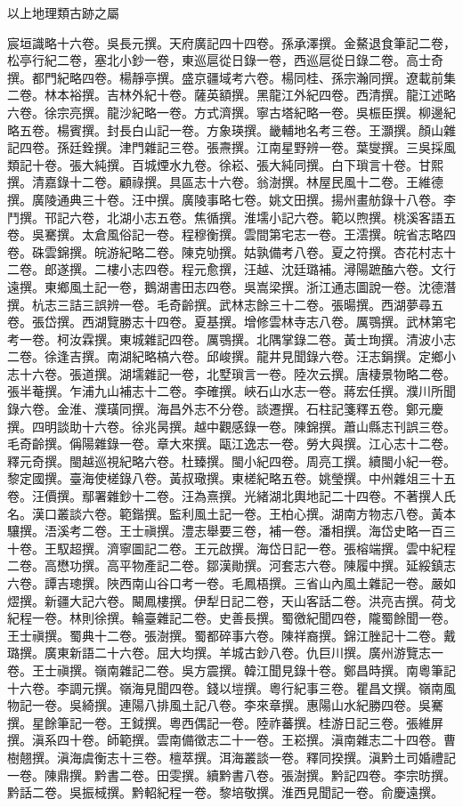 \begin{pinyinscope}
以上地理類古跡之屬

宸垣識略十六卷。吳長元撰。天府廣記四十四卷。孫承澤撰。金鰲退食筆記二卷，松亭行紀二卷，塞北小鈔一卷，東巡扈從日錄一卷，西巡扈從日錄二卷。高士奇撰。都門紀略四卷。楊靜亭撰。盛京疆域考六卷。楊同桂、孫宗瀚同撰。遼載前集二卷。林本裕撰。吉林外紀十卷。薩英額撰。黑龍江外紀四卷。西清撰。龍江述略六卷。徐宗亮撰。龍沙紀略一卷。方式濟撰。寧古塔紀略一卷。吳桭臣撰。柳邊紀略五卷。楊賓撰。封長白山記一卷。方象瑛撰。畿輔地名考三卷。王灝撰。顏山雜記四卷。孫廷銓撰。津門雜記三卷。張燾撰。江南星野辨一卷。葉燮撰。三吳採風類記十卷。張大純撰。百城煙水九卷。徐崧、張大純同撰。白下瑣言十卷。甘熙撰。清嘉錄十二卷。顧祿撰。具區志十六卷。翁澍撰。林屋民風十二卷。王維德撰。廣陵通典三十卷。汪中撰。廣陵事略七卷。姚文田撰。揚州畫舫錄十八卷。李鬥撰。邗記六卷，北湖小志五卷。焦循撰。淮壖小記六卷。範以煦撰。桃溪客語五卷。吳騫撰。太倉風俗記一卷。程穆衡撰。雲間第宅志一卷。王澐撰。皖省志略四卷。硃雲錦撰。皖游紀略二卷。陳克劬撰。姑孰備考八卷。夏之符撰。杏花村志十二卷。郎遂撰。二樓小志四卷。程元愈撰，汪越、沈廷璐補。潯陽蹠醢六卷。文行遠撰。東鄉風土記一卷，鵝湖書田志四卷。吳嵩梁撰。浙江通志圖說一卷。沈德潛撰。杭志三詰三誤辨一卷。毛奇齡撰。武林志餘三十二卷。張暘撰。西湖夢尋五卷。張岱撰。西湖覽勝志十四卷。夏基撰。增修雲林寺志八卷。厲鶚撰。武林第宅考一卷。柯汝霖撰。東城雜記四卷。厲鶚撰。北隅掌錄二卷。黃士珣撰。清波小志二卷。徐逢吉撰。南湖紀略槁六卷。邱峻撰。龍井見聞錄六卷。汪志鋗撰。定鄉小志十六卷。張道撰。湖壖雜記一卷，北墅瑣言一卷。陸次云撰。唐棲景物略二卷。張半菴撰。乍浦九山補志十二卷。李確撰。峽石山水志一卷。蔣宏任撰。濮川所聞錄六卷。金淮、濮璜同撰。海昌外志不分卷。談遷撰。石柱記箋釋五卷。鄭元慶撰。四明談助十六卷。徐兆昺撰。越中觀感錄一卷。陳錦撰。蕭山縣志刊誤三卷。毛奇齡撰。偁陽雜錄一卷。章大來撰。甌江逸志一卷。勞大與撰。江心志十二卷。釋元奇撰。閩越巡視紀略六卷。杜臻撰。閩小紀四卷。周亮工撰。續閩小紀一卷。黎定國撰。臺海使槎錄八卷。黃叔璥撰。東槎紀略五卷。姚瑩撰。中州雜俎三十五卷。汪價撰。鄢署雜鈔十二卷。汪為熹撰。光緒湖北輿地記二十四卷。不著撰人氏名。漢口叢談六卷。範鍇撰。監利風土記一卷。王柏心撰。湖南方物志八卷。黃本驤撰。浯溪考二卷。王士禛撰。澧志舉要三卷，補一卷。潘相撰。海岱史略一百三十卷。王馭超撰。濟寧圖記二卷。王元啟撰。海岱日記一卷。張榕端撰。雲中紀程二卷。高懋功撰。高平物產記二卷。鄒漢勛撰。河套志六卷。陳履中撰。延綏鎮志六卷。譚吉璁撰。陜西南山谷口考一卷。毛鳳梧撰。三省山內風土雜記一卷。嚴如熤撰。新疆大記六卷。闞鳳樓撰。伊犁日記二卷，天山客話二卷。洪亮吉撰。荷戈紀程一卷。林則徐撰。輪臺雜記二卷。史善長撰。蜀徼紀聞四卷，隴蜀餘聞一卷。王士禛撰。蜀典十二卷。張澍撰。蜀都碎事六卷。陳祥裔撰。錦江脞記十二卷。戴璐撰。廣東新語二十六卷。屈大均撰。羊城古鈔八卷。仇巨川撰。廣州游覽志一卷。王士禛撰。嶺南雜記二卷。吳方震撰。韓江聞見錄十卷。鄭昌時撰。南粵筆記十六卷。李調元撰。嶺海見聞四卷。錢以塏撰。粵行紀事三卷。瞿昌文撰。嶺南風物記一卷。吳綺撰。連陽八排風土記八卷。李來章撰。惠陽山水紀勝四卷。吳騫撰。星餘筆記一卷。王鉞撰。粵西偶記一卷。陸祚蕃撰。桂游日記三卷。張維屏撰。滇系四十卷。師範撰。雲南備徵志二十一卷。王崧撰。滇南雜志二十四卷。曹樹翹撰。滇海虞衡志十三卷。檀萃撰。洱海叢談一卷。釋同揆撰。滇黔土司婚禮記一卷。陳鼎撰。黔書二卷。田雯撰。續黔書八卷。張澍撰。黔記四卷。李宗昉撰。黔話二卷。吳振棫撰。黔軺紀程一卷。黎培敬撰。淮西見聞記一卷。俞慶遠撰。


\end{pinyinscope}
